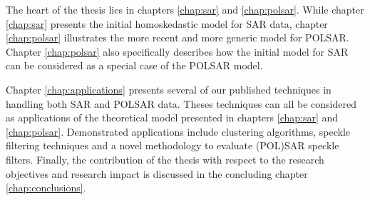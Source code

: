 The heart of the thesis lies in chapters \ref{chap:sar} and \ref{chap:polsar}.
While chapter \ref{chap:sar} presents the initial homoskedastic model for SAR data, 
chapter \ref{chap:polsar} illustrates the more recent and more generic model for POLSAR.
Chapter \ref{chap:polsar} also specifically describes how the initial model for SAR can be considered as a special case of the POLSAR model.

Chapter \ref{chap:applications} presents several of our published techniques in handling both SAR and POLSAR data.
Theses techniques can all be considered as applications of the theoretical model presented in chapters \ref{chap:sar} and \ref{chap:polsar}.
Demonstrated applications include clustering algorithms, speckle filtering techniques and a novel methodology to evaluate (POL)SAR speckle filters.
Finally, the contribution of the thesis with respect to the research objectives and research impact is discussed in the concluding chapter \ref{chap:conclusions}.

